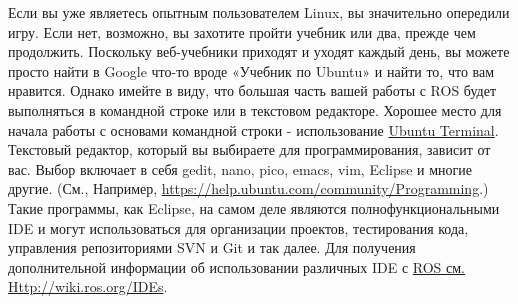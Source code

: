

Если вы уже являетесь опытным пользователем Linux, вы значительно опередили игру. Если нет, возможно, вы захотите пройти учебник или два, прежде чем продолжить. Поскольку веб-учебники приходят и уходят каждый день, вы можете просто найти в Google что-то вроде «Учебник по Ubuntu» и найти то, что вам нравится. Однако имейте в виду, что большая часть вашей работы с ROS будет выполняться в командной строке или в текстовом редакторе. Хорошее место для начала работы с основами командной строки - использование \href{https://help.ubuntu.com/community/UsingTheTerminal}{Ubuntu Terminal}. Текстовый редактор, который вы выбираете для программирования, зависит от вас. Выбор включает в себя gedit, nano, pico, emacs, vim, Eclipse и многие другие. (См., Например, \href{https://help.ubuntu.com/community/Programming}{https://help.ubuntu.com/community/Programming}.) Такие программы, как Eclipse, на самом деле являются полнофункциональными IDE и могут использоваться для организации проектов, тестирования кода, управления репозиториями SVN и Git и так далее. Для получения дополнительной информации об использовании различных IDE с \href{http://wiki.ros.org/IDEs}{ROS см. Http://wiki.ros.org/IDEs}.

